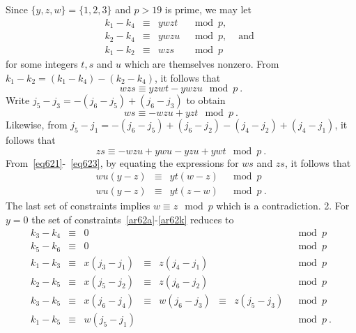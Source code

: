 \noindent Since $\{y,z,w\}=\{1,2,3\}$ and $p>19$ is prime, we may
let
\begin{equation}\begin{array}{ccccc}k_1-k_4 &\equiv& ywzt &\mod p, &{} \\
k_2-k_4 &\equiv& ywzu &\mod p, &\text{ and }\\k_1-k_2 &\equiv& wzs
&\mod p&{}
\end{array}\end{equation}
for some integers $t,s$ and $u$ which are themselves nonzero. From
$k_1-k_2=(k_1-k_4)-(k_2-k_4)$, it follows that
\begin{equation}\label{eq621}
wzs \equiv yzwt -ywzu \mod p~.
\end{equation}
Write $j_5-j_3=-(j_6-j_5)+(j_6-j_3)$ to obtain
\begin{equation}\label{eq622}
ws \equiv -wzu +yzt \mod p~.
\end{equation}
Likewise, from $j_5-j_1=-(j_6-j_5)+(j_6-j_2)-(j_4-j_2)+(j_4-j_1)$,
it follows that
\begin{equation}\label{eq623}
zs \equiv -wzu +ywu -yzu +ywt \mod p~.
\end{equation}
From~\eqref{eq621}-~\eqref{eq623}, by equating the expressions for
$ws$ and $zs$, it follows that
\begin{equation}\begin{array}{cccc}
wu(y-z) &\equiv &yt(w-z) &\mod p \\
wu(y-z) &\equiv &yt(z-w) &\mod p~.
\end{array}\end{equation}
The last set of constraints implies $w\equiv z \mod p$ which is a
contradiction. %
2. For $y=0$ the set of constraints~\eqref{ar62a}-\eqref{ar62k}
reduces to
\begin{equation}\begin{array}{cccccccccc}
k_3-k_4 &\equiv& 0 & {}& {}&{}&{}&\mod p
\\
k_5-k_6 &\equiv& 0 & {}& {}&{}&{}&\mod p\\
k_1-k_3 &\equiv& x(j_3-j_1)& \equiv& z(j_4-j_1)& {} &{}&\mod p
\\
k_2-k_5 &\equiv& x(j_5-j_2) &\equiv&  z(j_6-j_2) &{}&{} &\mod
p\\
k_3-k_5 &\equiv& x(j_6-j_4) &\equiv& w(j_6-j_3) &
\equiv& z(j_5-j_3)&\mod p\\
k_1-k_5 &\equiv& w(j_5-j_1) & {} & {} &{}&{}&\mod p~.
\end{array}\end{equation}
